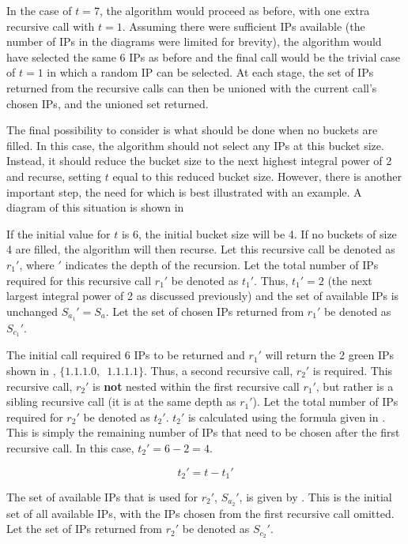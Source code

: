 In the case of $t = 7$, the algorithm would proceed as before, with one extra recursive call with $t = 1$. Assuming there were sufficient IPs available (the number of IPs in the diagrams were limited for brevity), the algorithm would have selected the same 6 IPs as before and the final call would be the trivial case of $t = 1$ in which a random IP can be selected. At each stage, the set of IPs returned from the recursive calls can then be unioned with the current call's chosen IPs, and the unioned set returned. 

The final possibility to consider is what should be done when no buckets are filled. In this case, the algorithm should not select any IPs at this bucket size. Instead, it should reduce the bucket size to the next highest integral power of 2 and recurse, setting $t$ equal to this reduced bucket size. However, there is another important step, the need for which is best illustrated with an example. A diagram of this situation is shown in 

If the initial value for $t$ is 6, the initial bucket size will be 4. If no buckets of size 4 are filled, the algorithm will then recurse. Let this recursive call be denoted as $r_1'$, where $'$ indicates the depth of the recursion. Let the total number of IPs required for this recursive call $r_1'$ be denoted as $t_1'$. Thus, $t_1' = 2$ (the next largest integral power of 2 as discussed previously) and the set of available IPs is unchanged $S_{a_1}' = S_a$. Let the set of chosen IPs returned from $r_1'$ be denoted as $S_{c_1}'$.

The initial call required 6 IPs to be returned and $r_1'$ will return the 2 green IPs shown in , $\{1.1.1.0,\enspace1.1.1.1\}$. Thus, a second recursive call, $r_2'$ is required. This recursive call, $r_2'$ is \textbf{not} nested within the first recursive call $r_1'$, but rather is a sibling recursive call (it is at the same depth as $r_1'$).  Let the total number of IPs required for $r_2'$ be denoted as $t_2'$. $t_2'$ is calculated using the formula given in . This is simply the remaining number of IPs that need to be chosen after the first recursive call. In this case, $t_2' = 6 - 2 = 4$. 

\begin{equation}\label{eq:secondRecurseT2}
t_2' = t - t_1'
\end{equation}

The set of available IPs that is used for $r_2'$, $S_{a_2}'$, is given by . This is the initial set of all available IPs, with the IPs chosen from the first recursive call omitted. Let the set of IPs returned from $r_2'$ be denoted as $S_{c_2}'$.

